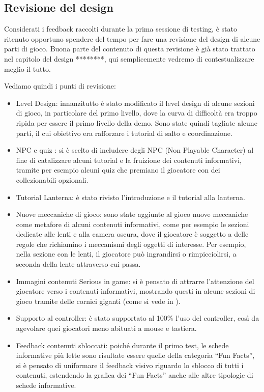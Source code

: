 \newpage

\subsection{Revisione del design}
\label{revisione}
Considerati i feedback raccolti durante la prima sessione di testing, è stato ritenuto opportuno spendere del tempo per fare una revisione del design di alcune parti di gioco.
Buona parte del contenuto di questa revisione è già stato trattato nel capitolo del design ********, qui semplicemente vedremo di contestualizzare meglio il tutto.

Vediamo quindi i punti di revisione:

\begin{itemize}

\item Level Design: innanzitutto è stato modificato il level design di alcune sezioni di gioco, in particolare del primo livello, dove la curva di difficoltà era troppo ripida per essere il primo livello della demo. Sono state quindi tagliate alcune parti, il cui obiettivo era rafforzare i tutorial di salto e coordinazione.
\item NPC e quiz : si è scelto di includere degli NPC (Non Playable Character) al fine di catalizzare alcuni tutorial e la fruizione dei contenuti informativi, tramite per esempio alcuni quiz che premiano il giocatore con dei collezionabili opzionali.
\item Tutorial Lanterna: è stato rivisto l'introduzione e il tutorial alla lanterna.
\item Nuove meccaniche di gioco: sono state aggiunte al gioco nuove meccaniche come metafore di alcuni contenuti informativi, come per esempio le sezioni dedicate alle lenti e alla camera oscura, dove il giocatore è soggetto a delle regole che richiamino i meccanismi degli oggetti di interesse. Per esempio, nella sezione con le lenti, il giocatore può ingrandirsi o rimpicciolirsi, a seconda della lente attraverso cui passa.
\item Immagini contenuti Serious in game: si è pensato di attrarre l'attenzione del giocatore verso i contenuti informativi, mostrando questi in alcune sezioni di gioco tramite delle cornici giganti (come si vede in \myfig{\ref{fig:cornice_serious}}).
\item Supporto al controller: è stato supportato al 100\% l'uso del controller, così da agevolare quei giocatori meno abituati a mouse e tastiera.
\item Feedback contenuti sbloccati: poiché durante il primo test, le schede informative più lette sono risultate essere quelle della categoria ``Fun Facts'', si è pensato di uniformare il feedback visivo riguardo lo sblocco di tutti i contenuti, estendendo la grafica dei ``Fun Facts'' anche alle altre tipologie di schede informative.

\end{itemize}

